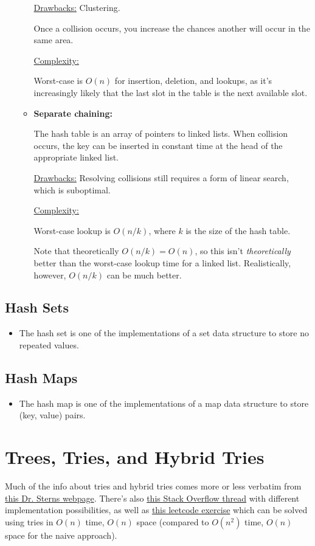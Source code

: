 \documentclass[12pt]{article}
\newcommand{\bb}[1]{\textbf{#1}}
\newcommand{\uln}[1]{{\noindent\ul{#1}}}
\newcommand{\vsp}{\vspace{0.75mm}}
\begin{document}
\begin{itemize}[topsep=0mm,itemsep=0mm,listparindent=6mm]
\begin{itemize}[topsep=0mm,itemsep=3mm]
			\uln{Drawbacks:} Clustering. 
			
			Once a collision occurs, you increase the chances another will occur in the same area.\vsp
			
			\uln{Complexity:} 
			
			Worst-case is $O(n)$ for insertion, deletion, and lookups, as it's increasingly likely that the last slot in the table is the next available slot.
			
			\item \bb{Separate chaining:}
			
			The hash table is an array of pointers to linked lists. When collision occurs, the key can be inserted in constant time at the head of the appropriate linked list.\vsp
			
			\uln{Drawbacks:} Resolving collisions still requires a form of linear search, which is suboptimal. \vsp
			
			\uln{Complexity:} 
			
			Worst-case lookup is $O(n/k)$, where $k$ is the size of the hash table. 
			
			Note that theoretically $O(n/k)=O(n)$, so this isn't \textit{theoretically} better than the worst-case lookup time for a linked list. Realistically, however, $O(n/k)$ can be much better.
		\end{itemize}
	\end{itemize}

	\subsection*{Hash Sets}
	\begin{itemize}
			\item The hash set is one of the implementations of a set data structure to store no repeated values.
	\end{itemize}

	\subsection*{Hash Maps}
		\begin{itemize}
		\item The hash map is one of the implementations of a map data structure to store (key, value) pairs.
	\end{itemize}

	\section*{Trees, Tries, and Hybrid Tries}
	Much of the info about tries and hybrid tries comes more or less verbatim from \href{https://drstearns.github.io/tutorials/trie/}{this Dr. Sterns webpage}. There's also \href{https://stackoverflow.com/questions/11015320/how-to-create-a-trie-in-python}{this Stack Overflow thread} with different implementation possibilities, as well as \href{https://leetcode.com/problems/replace-words/solution/}{this leetcode exercise} which can be solved using tries in $O(n)$ time, $O(n)$ space (compared to $O(n^2)$ time, $O(n)$ space for the naive approach).
	
\end{document}
